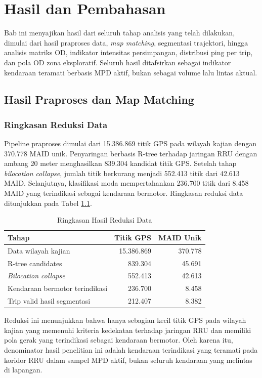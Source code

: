 \chapter{Hasil dan Pembahasan}

Bab ini menyajikan hasil dari seluruh tahap analisis yang telah dilakukan, dimulai dari hasil praproses data, \textit{map matching}, segmentasi trajektori, hingga analisis matriks OD, indikator intensitas persimpangan, distribusi ping per trip, dan pola OD zona eksploratif. Seluruh hasil ditafsirkan sebagai indikator kendaraan teramati berbasis MPD aktif, bukan sebagai volume lalu lintas aktual.

\section{Hasil Praproses dan Map Matching}

\subsection{Ringkasan Reduksi Data}

Pipeline praproses dimulai dari 15.386.869 titik GPS pada wilayah kajian dengan 370.778 MAID unik. Penyaringan berbasis R-tree terhadap jaringan RRU dengan ambang 20 meter menghasilkan 839.304 kandidat titik GPS. Setelah tahap \textit{bilocation collapse}, jumlah titik berkurang menjadi 552.413 titik dari 42.613 MAID. Selanjutnya, klasifikasi moda mempertahankan 236.700 titik dari 8.458 MAID yang terindikasi sebagai kendaraan bermotor. Ringkasan reduksi data ditunjukkan pada Tabel \ref{tab:hasil-reduksi}.

\begin{table}[htbp]
\centering
\caption{Ringkasan Hasil Reduksi Data}
\label{tab:hasil-reduksi}
\begin{tabular}{lrr}
\hline
Tahap & Titik GPS & MAID Unik\\
\hline
Data wilayah kajian & 15.386.869 & 370.778\\
R-tree candidates & 839.304 & 45.691\\
\textit{Bilocation collapse} & 552.413 & 42.613\\
Kendaraan bermotor terindikasi & 236.700 & 8.458\\
Trip valid hasil segmentasi & 212.407 & 8.382\\
\hline
\end{tabular}
\end{table}

Reduksi ini menunjukkan bahwa hanya sebagian kecil titik GPS pada wilayah kajian yang memenuhi kriteria kedekatan terhadap jaringan RRU dan memiliki pola gerak yang terindikasi sebagai kendaraan bermotor. Oleh karena itu, denominator hasil penelitian ini adalah kendaraan terindikasi yang teramati pada koridor RRU dalam sampel MPD aktif, bukan seluruh kendaraan yang melintas di lapangan.

